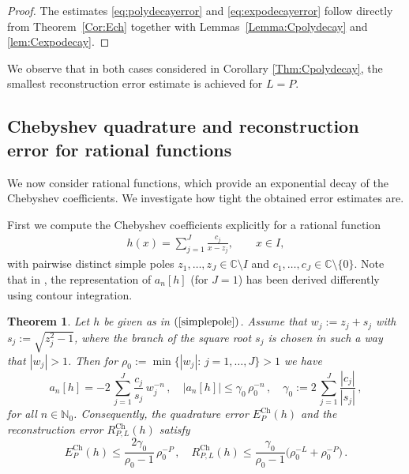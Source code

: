 \documentclass[11pt,a4paper]{scrartcl}
\newtheorem{theorem}{Theorem}[section]
\numberwithin{equation}{section}
\numberwithin{table}{section}
\numberwithin{figure}{section}
\newcommand{\C}{\mathbb C}
\newcommand{\Np}{{\mathbb N}_0}
\newcommand{\Ech}{E^{\mathrm{Ch}}}
\newcommand{\Rch}{R^{\mathrm{Ch}}}
\begin{document}
\begin{proof} The estimates \eqref{eq:polydecayerror} and \eqref{eq:expodecayerror} follow
directly from Theorem~\ref{Cor:Ech} together with Lemmas~\ref{Lemma:Cpolydecay} and
\ref{lem:Cexpodecay}.
\end{proof}

We observe that in both cases considered in Corollary \ref{Thm:Cpolydecay}, the smallest reconstruction error
estimate is achieved for $L=P$.

\subsection{Chebyshev quadrature and reconstruction error for rational  functions}
\label{sec:Crat}

We now consider rational functions, which provide an exponential decay of the Chebyshev
coefficients.  We investigate how tight the obtained error estimates are.

First we compute the Chebyshev coefficients explicitly for a rational function
\begin{align}\label{simplepole}
 \textstyle h(x) = \sum\limits_{j=1}^J \frac{c_j}{x-z_j}, \qquad x \in I,
 \end{align}
with pairwise distinct simple poles $z_1,\ldots,z_J\in\C\setminus I$ and
	$c_1,\ldots,c_J\in\C\setminus\{0\}$.   Note that  in \cite{El64}, the representation of $a_n[h]$ (for $J=1$) has been derived differently using contour
	integration.
	
	\begin{theorem}
	\label{Thm:rational}
	Let $h$ be given as in $(\ref{simplepole})$. Assume that $w_j :=z_j+ s_j$ with $s_j := \sqrt{z_j^2-1}$, where the  branch of the square root $s_j$ is chosen in such a way that
	$|w_j|>1$. Then for
	$\rho_0:=\min\{|w_j|:\,j=1,\ldots,J\}>1$  we have
	\begin{equation}
		\label{eq:rationalcoeffs}
		 \textstyle a_n[h] = - 2\,\sum\limits_{j=1}^{J}\frac{c_j}{s_j}\,w_j^{-n}\,, \quad
		|a_n[h]| \leq \gamma_0\,\rho_0^{-n}\,,\quad
		\gamma_0 := 2\,\sum\limits_{j=1}^{J}\frac{|c_j|}{|s_j|}\,,
	\end{equation}
	for all $n\in\Np$. Consequently, the quadrature error $\Ech_{P}(h)$ and the reconstruction error $\Rch_{P,L}(h)$
	satisfy
$$
	\textstyle 	\Ech_{P}(h) \leq \frac{2\gamma_0}{\rho_0-1}\,\rho_0^{-P}\,, \quad \Rch_{P,L}(h) \leq \frac{\gamma_0}{\rho_0-1}
		\bigl(\rho_0^{-L}+\rho_0^{-P}\bigr)\,.
$$
	\end{theorem}
\end{document}
